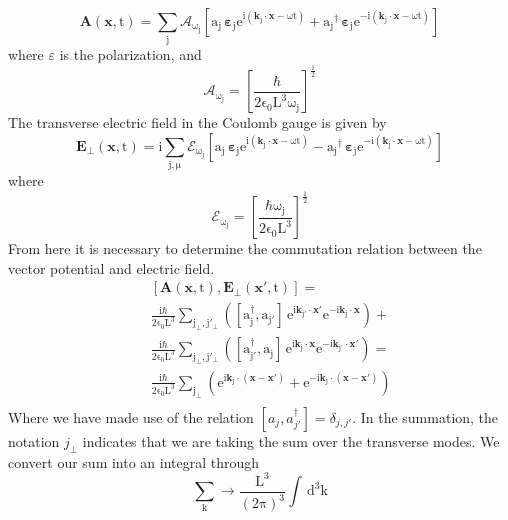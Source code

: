 \begin{equation}
\mathrm{\mathbf{A}(\mathbf{x},t)=\sum_j\mathcal{A}_{\omega_j}\left[a_j\,\mathbf{\varepsilon}_j e^{i(\mathbf{k}_j\cdot\mathbf{x}-\omega t)}+{a_j}^{\dagger}\,\mathbf{\varepsilon}_j e^{-i(\mathbf{k}_j\cdot\mathbf{x}-\omega t)}\right]}
\end{equation}
where $\varepsilon$ is the polarization, and
\begin{equation}
\mathrm{\mathcal{A}_{\omega_j}=\left[\frac{\hbar}{2\epsilon_0 L^3\omega_j}\right]^{\frac{1}{2}}}
\end{equation} 
The transverse electric field in the Coulomb gauge is given by
\begin{equation}
\mathrm{\mathbf{E}_{\perp}(\mathbf{x},t)=i\sum_{j,\mu}\mathcal{E}_{\omega_j}\left[a_j\,\mathbf{\varepsilon}_j e^{i(\mathbf{k}_j\cdot\mathbf{x}-\omega t)}-{a_j}^{\dagger}\,\mathbf{\varepsilon}_j e^{-i(\mathbf{k}_j\cdot\mathbf{x}-\omega t)}\right]}
\end{equation}
where
\begin{equation}
\mathrm{\mathcal{E}_{\omega_j}=\left[\frac{\hbar\omega_j}{2\epsilon_0 L^3}\right]^{\frac{1}{2}}}
\end{equation} 
From here it is necessary to determine the commutation relation between the vector potential and electric field.
\begin{eqnarray}
&&\mathrm{[\mathbf{A}(\mathbf{x},t),\mathbf{E}_{\perp}(\mathbf{x}',t)]=} \nonumber \\
&&\mathrm{\frac{i\hbar}{2\epsilon_0 L^3}\sum_{j_{\perp},j'_{\perp}}\left(\left[a^{\dagger}_{j},a_{j'}\right]\,e^{i\mathbf{k}_{j'}\cdot\mathbf{x'}}e^{-i\mathbf{k}_{j}\cdot\mathbf{x}}\right)+} \nonumber \\
&&\mathrm{\frac{i\hbar}{2\epsilon_0 L^3}\sum_{j_{\perp},j'_{\perp}}\left(\left[a^{\dagger}_{j'},a_{j}\right]\,e^{i\mathbf{k}_{j}\cdot\mathbf{x}}e^{-i\mathbf{k}_{j'}\cdot\mathbf{x'}}\right)=} \nonumber \\
&&\mathrm{\frac{i\hbar}{2\epsilon_0 L^3}\sum_{j_{\perp}}\left(e^{i\mathbf{k}_j\cdot(\mathbf{x}-\mathbf{x}')}+e^{-i\mathbf{k}_j\cdot(\mathbf{x}-\mathbf{x}')}\right)} \nonumber \\
\end{eqnarray}
Where we have made use of the relation $[a_j,a^{\dagger}_{j'}]=\delta_{j,j'}$.  In the summation, the notation $j_{\perp}$ indicates that we are taking the sum over the transverse modes. We convert our sum into an integral through \cite{loudonbook}
\begin{equation}
\mathrm{\sum_{k}\rightarrow \frac{L^3}{(2\pi)^3}\int\,d^3k}
\end{equation}
